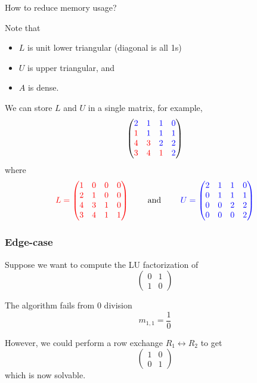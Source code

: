 \begin{remark}
    How to reduce memory usage?

    Note that
    \begin{itemize}
        \item \( L \) is unit lower triangular (diagonal is all 1s)
        \item \( U \) is upper triangular, and
        \item \( A \) is dense.
    \end{itemize}

    We can store \( L \) and \( U \) in a single matrix, for example, \[
        \begin{pmatrix}
            \color{blue} 2 & \color{blue} 1 & \color{blue} 1 & \color{blue} 0 \\
            \color{red} 1  & \color{blue} 1 & \color{blue} 1 & \color{blue} 1 \\
            \color{red} 4  & \color{red} 3  & \color{blue} 2 & \color{blue} 2 \\
            \color{red} 3  & \color{red} 4  & \color{red} 1  & \color{blue} 2
        \end{pmatrix}
    \] where \[
        {\color{red} L = \begin{pmatrix}
                    1 & 0 & 0 & 0 \\
                    2 & 1 & 0 & 0 \\
                    4 & 3 & 1 & 0 \\
                    3 & 4 & 1 & 1
                \end{pmatrix}}
        \qquad \text{ and } \qquad
        {\color{blue} U = \begin{pmatrix}
                2 & 1 & 1 & 0 \\
                0 & 1 & 1 & 1 \\
                0 & 0 & 2 & 2 \\
                0 & 0 & 0 & 2
            \end{pmatrix}}
    \]
\end{remark}

\subsubsection{Edge-case}

\begin{example}
    Suppose we want to compute the LU factorization of \[
        \begin{pmatrix}
            0 & 1 \\ 1 & 0
        \end{pmatrix}
    \]

    The algorithm fails from 0 division \[
        m_{1,1} = \frac{1}{0}
    \]

    However, we could perform a row exchange \( R_1 \leftrightarrow R_2 \) to get \[
        \begin{pmatrix}
            1 & 0 \\ 0 & 1
        \end{pmatrix}
    \] which is now solvable.

\end{example}

